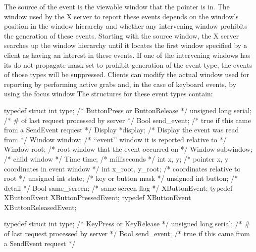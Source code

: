 \documentclass{report}
\begin{document}
\begin{itemize}
\begin{itemize}
            \end{itemize}
            The source of the event is the viewable window that the pointer is in. The window used by the X server to report these events depends on the window’s position in the window hierarchy and whether any intervening window prohibits the generation of these events. Starting with the source window, the X server searches up the window hierarchy until it locates the first window specified by a client as having an interest in these events. If one of the intervening windows has its do-not-propagate-mask set to prohibit generation of the event type, the events of those types will be suppressed. Clients can modify the actual window used for reporting by performing active grabs and, in the case of keyboard events, by using the focus window
            \bigbreak \noindent 
            The structures for these event types contain:
            \bigbreak \noindent 
            \begin{cppcode}
                typedef struct {
                    int type;               /* ButtonPress or ButtonRelease */
                    unsigned long serial;   /* # of last request processed by server */
                    Bool send_event;        /* true if this came from a SendEvent request */
                    Display *display;       /* Display the event was read from */
                    Window window;          /* ‘‘event’’ window it is reported relative to */
                    Window root;            /* root window that the event occurred on */
                    Window subwindow;       /* child window */
                    Time time;              /* milliseconds */
                    int x, y;               /* pointer x, y coordinates in event window */
                    int x_root, y_root;     /* coordinates relative to root */
                    unsigned int state;     /* key or button mask */
                    unsigned int button;    /* detail */
                    Bool same_screen;       /* same screen flag */
                } XButtonEvent;
                typedef XButtonEvent XButtonPressedEvent;
                typedef XButtonEvent XButtonReleasedEvent; 
            \end{cppcode}
            \bigbreak \noindent 
            \begin{cppcode}
                typedef struct {
                    int type;               /* KeyPress or KeyRelease */
                    unsigned long serial;   /* # of last request processed by server */
                    Bool send_event;        /* true if this came from a SendEvent request */
}
\end{cppcode}
\end{itemize}
\end{document}
